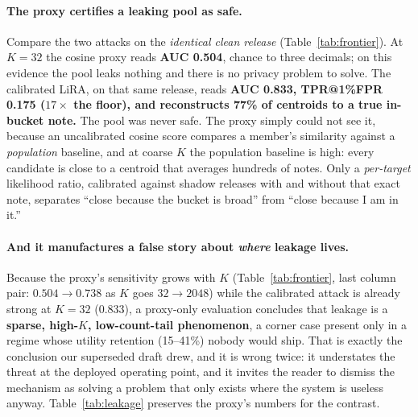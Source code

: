 \documentclass[pdflatex,sn-mathphys-num,iicol]{sn-jnl}
\theoremstyle{thmstyleone}%
\theoremstyle{thmstyletwo}%
\theoremstyle{thmstylethree}%
\begin{document}
\paragraph{The proxy certifies a leaking pool as safe.} Compare the two attacks on the
\emph{identical clean release} (Table~\ref{tab:frontier}). At $K = 32$ the cosine proxy
reads \textbf{AUC 0.504}, chance to three decimals; on this evidence the pool leaks
nothing and there is no privacy problem to solve. The calibrated LiRA, on that same
release, reads \textbf{AUC 0.833, TPR@1\%FPR 0.175 ($17\times$ the floor), and reconstructs
77\% of centroids to a true in-bucket note.} The pool was never safe. The proxy simply
could not see it, because an uncalibrated cosine score compares a member's similarity
against a \emph{population} baseline, and at coarse $K$ the population baseline is high:
every candidate is close to a centroid that averages hundreds of notes. Only a
\emph{per-target} likelihood ratio, calibrated against shadow releases with and without
that exact note, separates ``close because the bucket is broad'' from ``close because I
am in it.''

\paragraph{And it manufactures a false story about \emph{where} leakage lives.} Because the
proxy's sensitivity grows with $K$ (Table~\ref{tab:frontier}, last column pair: $0.504 \to
0.738$ as $K$ goes $32 \to 2048$) while the calibrated attack is already strong at $K = 32$
($0.833$), a proxy-only evaluation concludes that leakage is a \textbf{sparse, high-$K$,
low-count-tail phenomenon}, a corner case present only in a regime whose utility
retention (15--41\%) nobody would ship. That is exactly the conclusion our superseded draft
drew, and it is wrong twice: it understates the threat at the deployed operating point, and
it invites the reader to dismiss the mechanism as solving a problem that only exists where
the system is useless anyway. Table~\ref{tab:leakage} preserves the proxy's numbers for the
contrast.
\end{document}
